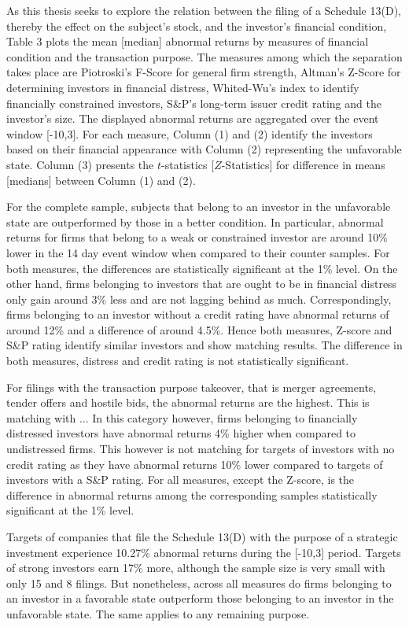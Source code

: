 \documentclass[12pt]{article}
\begin{document}
As this thesis seeks to explore the relation between the filing of a Schedule 13(D), thereby the effect on the subject's stock, and the investor's financial condition, Table 3 plots the mean [median] abnormal returns by measures of financial condition and the transaction purpose. The measures among which the separation takes place are Piotroski's F-Score for general firm strength, Altman's Z-Score for determining investors in financial distress, Whited-Wu's index to identify financially constrained investors, S\&P's long-term issuer credit rating and the investor's size. 
The displayed abnormal returns are aggregated over the event window [-10,3]. For each measure, Column (1) and (2) identify the investors based on their financial appearance with Column (2) representing the unfavorable state. Column (3) presents the $t$-statistics [$Z$-Statistics] for difference in means [medians] between Column (1) and (2). 

For the complete sample, subjects that belong to an investor in the unfavorable state are outperformed by those in a better condition.  In particular, abnormal returns for firms that belong to a weak or constrained investor are around 10\% lower in the 14 day event window when compared to their counter samples. For both measures, the differences are statistically significant at the 1\% level. 
On the other hand, firms belonging to investors that are ought to be in financial distress only gain around 3\% less and are not lagging behind as much. Correspondingly, firms belonging to an investor without a credit rating have abnormal returns of around 12\% and a difference of around 4.5\%. Hence both measures, Z-score and S\&P rating identify similar investors and show matching results. The difference in both measures, distress and credit rating is not statistically significant.

For filings with the transaction purpose takeover, that is merger agreements, tender offers and hostile bids, the abnormal returns are the highest. This is matching with ... 
In this category however, firms belonging to financially distressed investors have abnormal returns 4\% higher when compared to undistressed firms. This however is not matching for targets of investors with no credit rating as they have abnormal returns 10\% lower compared to targets of investors with a S\&P rating.  
For all measures, except the Z-score, is the difference in abnormal returns among the corresponding samples statistically significant at the 1\% level. 

Targets of companies that file the Schedule 13(D) with the purpose of a strategic investment experience 10.27\% abnormal returns during the [-10,3] period. 
Targets of strong investors earn 17\% more, although the sample size is very small with only 15 and 8 filings. But nonetheless, across all measures do firms belonging to an investor in a favorable state outperform those belonging to an investor in the unfavorable state. The same applies to any remaining purpose. 
\end{document}
